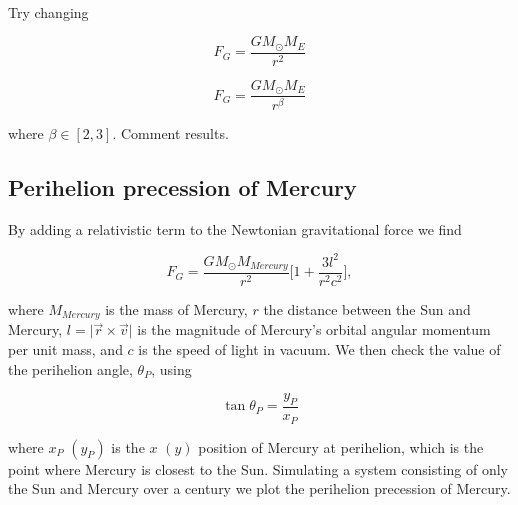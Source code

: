 \documentclass[a4paper, fontsize=11pt]{article}
\begin{document}
\paragraph{}

Try changing 

\begin{equation}
F_{G} = \dfrac{G M_{\odot} M_{E}}{r^2}
\end{equation}


\begin{equation}
F_{G} = \dfrac{G M_{\odot} M_{E}}{r^\beta}
\end{equation}

where $\beta \in [2,3]$. Comment results.



\subsection{Perihelion precession of Mercury}

By adding a relativistic term to the Newtonian gravitational force we find

\begin{equation}
F_{G} = \dfrac{G M_{\odot} M_{Mercury}}{r^2}\Big[1 + \dfrac{3l^2}{r^2c^2} \Big],
\end{equation}

where $M_{Mercury}$ is the mass of Mercury, $r$ the distance between the Sun and Mercury, $l = \lvert \vec{r} \times \vec{v} \rvert$ is the magnitude of Mercury's orbital angular momentum per unit mass, and $c$ is the speed of light in vacuum. We then check the value of the perihelion angle, $\theta_{P}$, using

\begin{equation}
\tan \theta_{P} = \dfrac{y_{P}}{x_{P}}
\end{equation}

where $x_{P}$ $(y_{P})$ is the $x$ $(y)$ position of Mercury at perihelion, which is the point where Mercury is closest to the Sun. Simulating a system consisting of only the Sun and Mercury over a century we plot the perihelion precession of Mercury.
\end{document}
